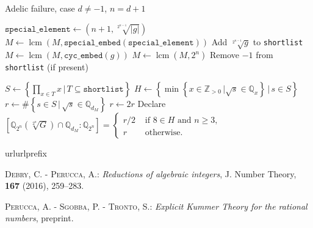 \documentclass[10pt,a4paper]{report}
\DeclareMathOperator{\lcm}{lcm}
\theoremstyle{definition}
\begin{document}
\begin{algorithm}
\caption{Adelic failure, case $d\neq -1$, $n= d+1$}
\begin{algorithmic}
\State $\texttt{special\_element}\leftarrow(n+1,\sqrt[2^{n-1}]{|g|})$
\State $M\leftarrow\lcm(M,\texttt{special\_embed}(\texttt{special\_element}))$
\Else 
\State Add $\sqrt[2^{n-1}]{g}$ to \texttt{shortlist}
\State $M\leftarrow\lcm(M,\texttt{cyc\_embed}(g))$
\EndIf
\EndFor
\State
\State $M\leftarrow\lcm(M,2^{n})$
\State
\State Remove $-1$ from \texttt{shortlist} (if present)


\State
{}
\State $S\leftarrow\left\{\prod_{x\in T}x\,|\,T\subseteq\texttt{shortlist}\right\}$
\State $H\leftarrow\left\{\min\left\{x\in\mathbb{Z}_{>0}\,|\sqrt{s}\in \mathbb{Q}_x\right\}\,|\,s\in S\right\}$
\State $r\leftarrow\# \left\{s\in S\,|\, \sqrt{s}\in\mathbb{Q}_{d_M}\right\}$
\State
\State $r\leftarrow 2r$
\EndIf
\State Declare $\left[\mathbb{Q}_{2^n}\left(\sqrt[2^n]{G}\right)\cap \mathbb{Q}_{d_M}:\mathbb{Q}_{2^n}\right]=\begin{cases}
r/2&\text{ if }8\in H\text{ and }n\geq 3,\\
r&\text{ otherwise}.
\end{cases}$
\EndFor
\end{algorithmic}

\end{algorithm}

\begin{thebibliography}{10} \expandafter\ifx\csname url\endcsname\relax   \def\url#1{\texttt{#1}}\fi \expandafter\ifx\csname urlprefix\endcsname\relax\def\urlprefix{URL }\fi

\textsc{Debry, C. - Perucca, A.}: \emph{Reductions of algebraic integers}, J. Number Theory, {\bf 167} (2016), 259--283.

\textsc{Perucca, A. - Sgobba, P. - Tronto, S.}: \emph{Explicit Kummer Theory for the rational numbers}, preprint.

\end{thebibliography}
\end{document}
